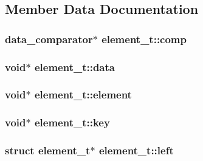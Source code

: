 \subsection{Member Data Documentation}
\hypertarget{structelement__t_a46ae4bd6ebad05a5b4baacd212bc3c72}{
\subsubsection[{comp}]{\setlength{\rightskip}{0pt plus 5cm}data\-\_\-comparator$\ast$ element\-\_\-t\-::comp}}\label{structelement__t_a46ae4bd6ebad05a5b4baacd212bc3c72}
\hypertarget{structelement__t_a40f42c98500e0c8cb258c2f8fac7fdf2}{
\subsubsection[{data}]{\setlength{\rightskip}{0pt plus 5cm}void$\ast$ element\-\_\-t\-::data}}\label{structelement__t_a40f42c98500e0c8cb258c2f8fac7fdf2}
\hypertarget{structelement__t_aa8f6446dfa11f92299dfcdd7d7ccdaf5}{
\subsubsection[{element}]{\setlength{\rightskip}{0pt plus 5cm}void$\ast$ element\-\_\-t\-::element}}\label{structelement__t_aa8f6446dfa11f92299dfcdd7d7ccdaf5}
\hypertarget{structelement__t_a3b62ab0ad40417ea023da490e9bb19d8}{
\subsubsection[{key}]{\setlength{\rightskip}{0pt plus 5cm}void$\ast$ element\-\_\-t\-::key}}\label{structelement__t_a3b62ab0ad40417ea023da490e9bb19d8}
\hypertarget{structelement__t_a68b10a17bd169bb5f4ac8498f9759a63}{
\subsubsection[{left}]{\setlength{\rightskip}{0pt plus 5cm}struct {\bf element\-\_\-t}$\ast$ element\-\_\-t\-::left}}\label{structelement__t_a68b10a17bd169bb5f4ac8498f9759a63}
